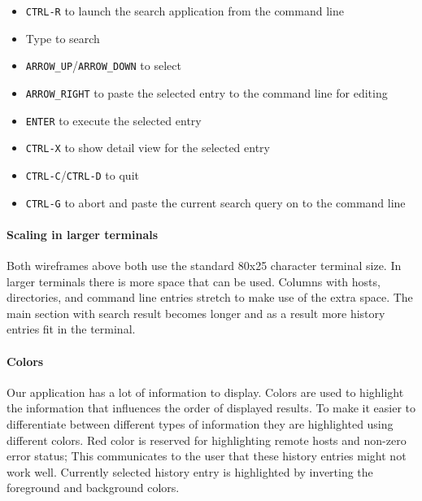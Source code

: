 \documentclass[thesis=M,english]{FITthesis}[2012/10/20]
\begin{document}
\begin{itemize}
    \item \verb|CTRL-R| to launch the search application from the command line
    \item Type to search
    \item \verb|ARROW_UP|/\verb|ARROW_DOWN| to select 
    \item \verb|ARROW_RIGHT| to paste the selected entry to the command line for editing
    \item \verb|ENTER| to execute the selected entry
    \item \verb|CTRL-X| to show detail view for the selected entry
    \item \verb|CTRL-C|/\verb|CTRL-D| to quit
    \item \verb|CTRL-G| to abort and paste the current search query on to the command line
\end{itemize}


\paragraph{Scaling in larger terminals}

Both wireframes above both use the standard 80x25 character terminal size. In larger terminals there is more space that can be used. Columns with hosts, directories, and command line entries stretch to make use of the extra space. The main section with search result becomes longer and as a result more history entries fit in the terminal.   

\paragraph{Colors}

Our application has a lot of information to display. 
Colors are used to highlight the information that influences the order of displayed results. To make it easier to differentiate between different types of information they are highlighted using different colors. 
Red color is reserved for highlighting remote hosts and non-zero error status; This communicates to the user that these history entries might not work well.
Currently selected history entry is highlighted by inverting the foreground and background colors.
\end{document}
